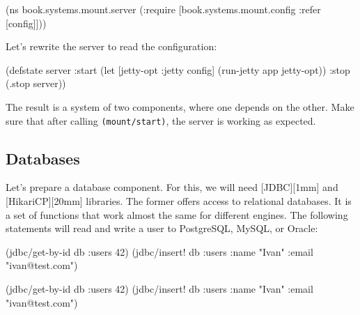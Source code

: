 \else

\begin{english}
  \begin{clojure}
(ns book.systems.mount.server
 (:require
  [book.systems.mount.config :refer [config]]))
  \end{clojure}
\end{english}

\fi

\noindent
Let's rewrite the server to read the configuration:

\begin{english}
  \begin{clojure}
(defstate server
  :start
  (let [{jetty-opt :jetty} config]
    (run-jetty app jetty-opt))
  :stop
  (.stop server))
  \end{clojure}
\end{english}

The result is a system of two components, where one depends on the other. Make sure that after calling \verb|(mount/start)|, the server is working as expected.

\subsection{Databases}


Let's prepare a database component. For this, we will need [JDBC][1mm] and [HikariCP][20mm] libraries. The former offers access to relational databases. It is a set of functions that work almost the same for different engines. The following statements will read and write a user to PostgreSQL, MySQL, or Oracle:

\ifnarrow

\begin{english}
  \begin{clojure}
(jdbc/get-by-id db :users 42)
(jdbc/insert! db :users
  {:name "Ivan" :email "ivan@test.com"})
  \end{clojure}
\end{english}

\else

\begin{english}
  \begin{clojure}
(jdbc/get-by-id db :users 42)
(jdbc/insert! db :users {:name "Ivan" :email "ivan@test.com"})
  \end{clojure}
\end{english}

